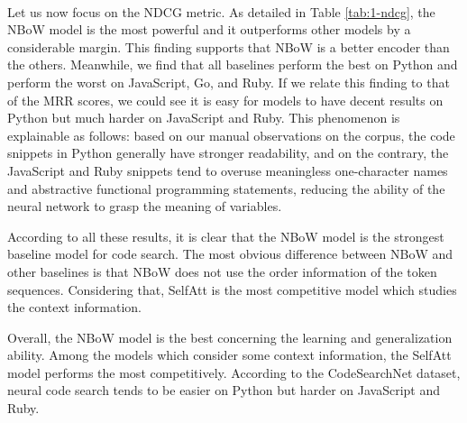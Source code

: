 \documentclass[conference]{IEEEtran}
\begin{document}
\begin{table}[thb]
\centering
\caption{RQ1: NDCG Scores of Baseline Models}
~\\
\label{tab:1-ndcg}
\end{table}
 Let us now focus on the NDCG metric. As detailed in Table \ref{tab:1-ndcg}, the NBoW model is the most powerful and it outperforms other models by a considerable margin. This finding supports that NBoW is a better encoder than the others. Meanwhile, we find that all baselines perform the best on Python and perform the worst on JavaScript, Go, and Ruby. If we relate this finding to that of the MRR scores, we could see it is easy for models to have decent results on Python but much harder on JavaScript and Ruby. This phenomenon is explainable as follows: based on our manual observations on the corpus, the code snippets in Python generally have stronger readability, and on the contrary, the JavaScript and Ruby snippets tend to overuse meaningless one-character names and abstractive functional programming statements, reducing the ability of the neural network to grasp the meaning of variables.




According to all these results, it is clear that the NBoW model is the strongest baseline model for code search. The most obvious difference between NBoW and other baselines is that NBoW does not use the order information of the token sequences. Considering that, SelfAtt is the most competitive model which studies the context information.

\begin{tcolorbox}[fonttitle=\bfseries,title={Answer to Research Question 1}]
  \textbf{\rqaaa}
  \tcblower
  Overall, the NBoW model is the best concerning the learning and generalization ability. Among the models which consider some context information, the SelfAtt model performs the most competitively. According to the CodeSearchNet dataset, neural code search tends to be easier on Python but harder on JavaScript and Ruby.
\end{tcolorbox}
\end{document}

